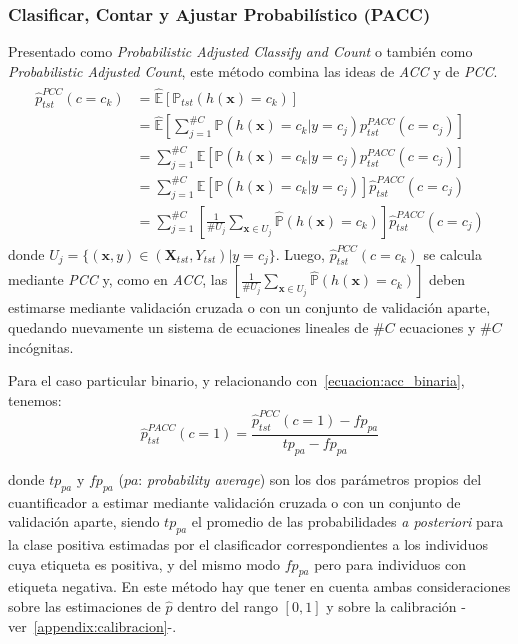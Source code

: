 \subsubsection{Clasificar, Contar y Ajustar Probabilístico (PACC)}

Presentado como {\it Probabilistic Adjusted Classify and Count\/} o también como
{\it Probabilistic Adjusted Count}, este método combina las ideas de {\it ACC\/}
y de {\it PCC}.
\begin{align}
\begin{split}
    \hat p^{PCC}_{tst}(c=c_k) &= \mathbb{\hat E}[\mathbb{P}_{tst}(h(\boldsymbol{x})=c_k)] \\
    &= \mathbb{\hat E}[\sum \limits_{j=1}^{\#C}{\mathbb{P}(h(\boldsymbol{x})=c_k|y=c_j) p^{PACC}_{tst}(c=c_j)}] \\
    &= \sum \limits_{j=1}^{\#C}\mathbb{\hat E}[{\mathbb{P}(h(\boldsymbol{x})=c_k|y=c_j) p^{PACC}_{tst}(c=c_j)}] \\
    &= \sum \limits_{j=1}^{\#C}\mathbb{\hat E}[{\mathbb{P}(h(\boldsymbol{x})=c_k|y=c_j)}] \hat p^{PACC}_{tst}(c=c_j) \\
    &= \sum \limits_{j=1}^{\#C} [\frac {1}{\#U_j} \sum_{\boldsymbol{x} \in U_j} \mathbb{\hat P}(h(\boldsymbol{x})=c_k)] \hat p^{PACC}_{tst}(c=c_j)
\end{split}
\end{align}
donde $U_j=\{(\boldsymbol{x}, y) \in (\boldsymbol{X}_{tst}, Y_{tst}) | y=c_j\}$.
Luego, $\hat p^{PCC}_{tst}(c=c_k)$ se calcula mediante {\it PCC\/} y, como en
{\it ACC}, las $[\frac {1}{\#U_j} \sum_{\boldsymbol{x} \in U_j}
\mathbb{\hat{P}}(h(\boldsymbol{x})=c_k)]$ deben estimarse mediante validación
cruzada o con un conjunto de validación aparte, quedando nuevamente un sistema
de ecuaciones lineales de $\#C$ ecuaciones y $\#C$ incógnitas.

Para el caso particular binario, y relacionando con~\ref{ecuacion:acc_binaria},
tenemos:
\begin{equation}
    \hat p^{PACC}_{tst}(c=1) = \frac{\hat p^{PCC}_{tst}(c=1)-fp_{pa}}{tp_{pa}-fp_{pa}}
\end{equation}

donde $tp_{pa}$ y $fp_{pa}$ ($pa$: {\it probability average\/}) son los dos
parámetros propios del cuantificador a estimar mediante validación cruzada o con
un conjunto de validación aparte, siendo $tp_{pa}$ el promedio de las
probabilidades {\it a posteriori\/} para la clase positiva estimadas por el
clasificador correspondientes a los individuos cuya etiqueta es positiva, y del
mismo modo $fp_{pa}$ pero para individuos con etiqueta negativa. En este método
hay que tener en cuenta ambas consideraciones sobre las estimaciones de $\hat p$
dentro del rango $[0, 1]$ y sobre la calibración
-ver~\ref{appendix:calibracion}-.

